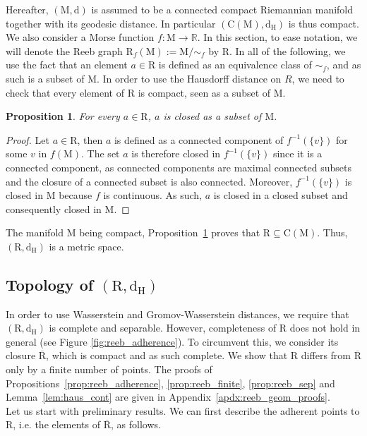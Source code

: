 \documentclass[pdflatex,sn-mathphys-ay]{sn-jnl}%
\newtheorem{proposition}{Proposition}[section]
\newcommand{\reeb}{\mathrm{R}}
\newcommand{\man}{\mathrm{M}}
\newcommand{\dis}{\mathrm{d}}
\newcommand{\Reeb}{{\mathrm R}}
\newcommand{\comp}{{\mathrm {C}}}
\newcommand{\haus}{{\mathrm {d_H}}}
\newcommand{\R}{\mathbb{R}}
\newcommand{\preim}[2]{#1^{-1}(#2)}
\newcommand{\change}[1]{\noindent #1}
\theoremstyle{thmstyleone}%
\begin{document}
Hereafter, $(\man,\dis)$ is assumed to be a connected compact Riemannian manifold together with its geodesic distance. \change{In particular $(\comp(\man),\haus)$  is thus compact.} We also consider a Morse function $f\colon\man\rightarrow\R$. 
In this section, to ease notation, we will denote the Reeb graph $\Reeb_f(\man):=\man/\sim_{f}$ by $\reeb$. \change{In all of the following, we use the fact that an element $a\in\reeb$ is defined as an equivalence class of $\sim_{f}$, and as such is a subset of $\man$. In order to use the Hausdorff distance on $R$, we need to check that every element of $\reeb$ is compact, seen as a subset of $\man$.}
\begin{proposition}\label{prop:reeb_closed}For every $a\in\reeb$, $a$ is closed as a subset of $\man$.
\end{proposition}
\begin{proof}
Let $a\in\reeb$, then $a$ is defined as a connected component of $\preim{f}{\{v\}}$ for some $v$ in $f(\man)$. The set
$a$ is therefore closed in $\preim{f}{\{v\}}$ since it is a connected component, as connected components are maximal connected subsets and the closure of a connected subset is also connected. Moreover, $\preim{f}{\{v\}}$ is closed in $\man$ because $f$ is continuous. As such, $a$ is closed in a closed subset and consequently closed in $\man$.
\end{proof}

The manifold $\man$ being compact, Proposition~\ref{prop:reeb_closed} proves that $\reeb\subseteq\comp(\man)$. Thus, $(\reeb,\haus)$ is a metric space.

\subsection{Topology of \texorpdfstring{$(\reeb,\haus)$}{TEXT}}\label{sec:reeb_top}
In order to use Wasserstein and Gromov-Wasserstein distances, we require that $(\reeb,\haus)$ is complete and separable. However, completeness of $\reeb$ does not hold in general (see Figure \ref{fig:reeb_adherence}). To circumvent this, we consider its closure $\overline{\reeb}$, which is compact and as such complete. We show that $\reeb$ differs from $\overline{\reeb}$ only by a finite number of points. \change{The proofs of Propositions~\ref{prop:reeb_adherence}, \ref{prop:reeb_finite}, \ref{prop:reeb_sep} and Lemma~\ref{lem:haus_cont} are given in Appendix~\ref{apdx:reeb_geom_proofs}.}\\
Let us start with preliminary results. \change{We can first describe the adherent points to $\reeb$, i.e. the elements of $\overline{\reeb}$, as follows.}
\end{document}
